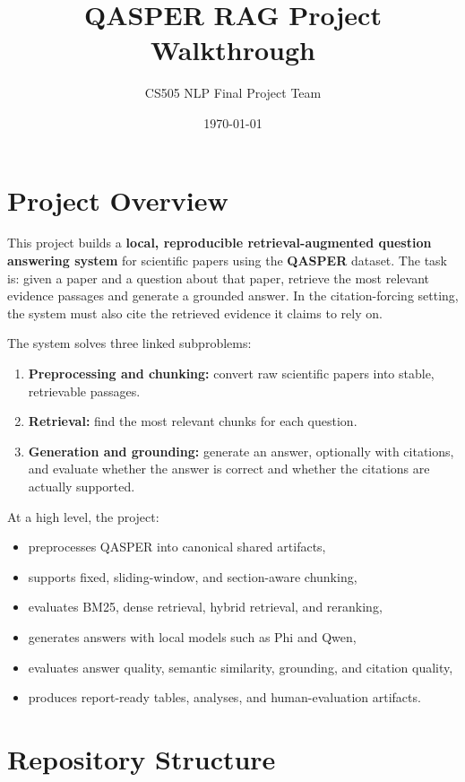 \documentclass[11pt]{article}
\title{\textbf{QASPER RAG Project Walkthrough}}
\author{CS505 NLP Final Project Team}
\date{\today}
\begin{document}
\maketitle

\section{Project Overview}
This project builds a \textbf{local, reproducible retrieval-augmented question answering system} for scientific papers using the \textbf{QASPER} dataset. The task is: given a paper and a question about that paper, retrieve the most relevant evidence passages and generate a grounded answer. In the citation-forcing setting, the system must also cite the retrieved evidence it claims to rely on.

The system solves three linked subproblems:
\begin{enumerate}
  \item \textbf{Preprocessing and chunking:} convert raw scientific papers into stable, retrievable passages.
  \item \textbf{Retrieval:} find the most relevant chunks for each question.
  \item \textbf{Generation and grounding:} generate an answer, optionally with citations, and evaluate whether the answer is correct and whether the citations are actually supported.
\end{enumerate}

At a high level, the project:
\begin{itemize}
  \item preprocesses QASPER into canonical shared artifacts,
  \item supports fixed, sliding-window, and section-aware chunking,
  \item evaluates BM25, dense retrieval, hybrid retrieval, and reranking,
  \item generates answers with local models such as Phi and Qwen,
  \item evaluates answer quality, semantic similarity, grounding, and citation quality,
  \item produces report-ready tables, analyses, and human-evaluation artifacts.
\end{itemize}

\section{Repository Structure}
\end{document}
